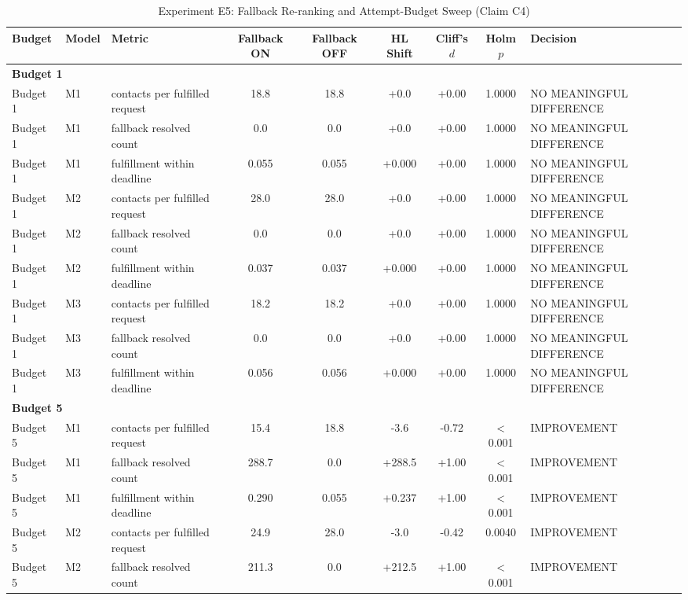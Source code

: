 \begin{table}[t]
\centering
\small
\caption{Experiment E5: Fallback Re-ranking and Attempt-Budget Sweep (Claim C4)}
\label{tab:e5_fallback}
\begin{tabular}{lllcccccl}
\toprule
Budget & Model & Metric & Fallback ON & Fallback OFF & HL Shift & Cliff's $d$ & Holm $p$ & Decision \\
\midrule
\multicolumn{9}{l}{\textbf{Budget 1}} \\
\midrule
Budget 1 & M1 & contacts per fulfilled request & 18.8 & 18.8 & +0.0 & +0.00 & 1.0000 & NO MEANINGFUL DIFFERENCE \\
Budget 1 & M1 & fallback resolved count & 0.0 & 0.0 & +0.0 & +0.00 & 1.0000 & NO MEANINGFUL DIFFERENCE \\
Budget 1 & M1 & fulfillment within deadline & 0.055 & 0.055 & +0.000 & +0.00 & 1.0000 & NO MEANINGFUL DIFFERENCE \\
Budget 1 & M2 & contacts per fulfilled request & 28.0 & 28.0 & +0.0 & +0.00 & 1.0000 & NO MEANINGFUL DIFFERENCE \\
Budget 1 & M2 & fallback resolved count & 0.0 & 0.0 & +0.0 & +0.00 & 1.0000 & NO MEANINGFUL DIFFERENCE \\
Budget 1 & M2 & fulfillment within deadline & 0.037 & 0.037 & +0.000 & +0.00 & 1.0000 & NO MEANINGFUL DIFFERENCE \\
Budget 1 & M3 & contacts per fulfilled request & 18.2 & 18.2 & +0.0 & +0.00 & 1.0000 & NO MEANINGFUL DIFFERENCE \\
Budget 1 & M3 & fallback resolved count & 0.0 & 0.0 & +0.0 & +0.00 & 1.0000 & NO MEANINGFUL DIFFERENCE \\
Budget 1 & M3 & fulfillment within deadline & 0.056 & 0.056 & +0.000 & +0.00 & 1.0000 & NO MEANINGFUL DIFFERENCE \\
\midrule
\multicolumn{9}{l}{\textbf{Budget 5}} \\
\midrule
Budget 5 & M1 & contacts per fulfilled request & 15.4 & 18.8 & -3.6 & -0.72 & < 0.001 & IMPROVEMENT \\
Budget 5 & M1 & fallback resolved count & 288.7 & 0.0 & +288.5 & +1.00 & < 0.001 & IMPROVEMENT \\
Budget 5 & M1 & fulfillment within deadline & 0.290 & 0.055 & +0.237 & +1.00 & < 0.001 & IMPROVEMENT \\
Budget 5 & M2 & contacts per fulfilled request & 24.9 & 28.0 & -3.0 & -0.42 & 0.0040 & IMPROVEMENT \\
Budget 5 & M2 & fallback resolved count & 211.3 & 0.0 & +212.5 & +1.00 & < 0.001 & IMPROVEMENT \\

\end{tabular}
\end{table}
